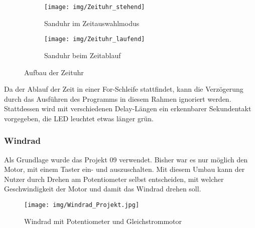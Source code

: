 \begin{figure}[h]
	\centering
	\begin{subfigure}[b]{0.48\linewidth}
		\centering
		\texttt{[image: img/Zeituhr\_stehend]}
		\caption{Sanduhr im Zeitauswahlmodus}\label{stehend}
	\end{subfigure}\enspace%
	\begin{subfigure}[b]{0.48\linewidth}
		\centering
		\texttt{[image: img/Zeituhr\_laufend]}
		\caption{Sanduhr beim Zeitablauf}\label{laufend}
	\end{subfigure}
	\caption{Aufbau der Zeituhr}\label{Zeituhr}
\end{figure}

Da der Ablauf der Zeit in einer For-Schleife stattfindet, kann die Verzögerung durch das Ausführen des Programms in diesem Rahmen ignoriert werden. Stattdessen wird mit verschiedenen Delay-Längen ein erkennbarer Sekundentakt vorgegeben, die LED leuchtet etwas länger grün. 

\subsubsection{Windrad}

 Als Grundlage wurde das Projekt 09 \autocite{arduino} verwendet. Bisher war es nur möglich den Motor, mit einem Taster ein- und auszuschalten. Mit diesem Umbau kann der Nutzer durch Drehen am Potentiometer selbst entscheiden, mit welcher Geschwindigkeit der Motor und damit das Windrad drehen soll.
\\

\begin{figure}[h]
\begin{center}
\texttt{[image: img/Windrad\_Projekt.jpg]}
\caption{Windrad mit Potentiometer und Gleichstrommotor}
\label{Windrad_project}
\end{center}
\end{figure}

